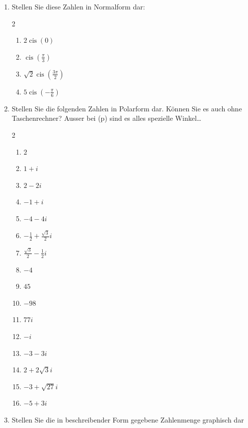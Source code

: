 \begin{ueb}
    {}{}
    \begin{enumerate}
        \item Stellen Sie diese Zahlen in Normalform dar:
        \begin{multicols}{2}
            \begin{enumerate}
                \item[(a)] $2 \operatorname{cis}(0)$
                \item[(b)] $\operatorname{cis}\left(\frac{\pi}{3}\right)$
                \item[(c)] $\sqrt{2} \operatorname{cis}\left(\frac{3\pi}{2}\right)$
                \item[(d)] $5 \operatorname{cis}\left(-\frac{\pi}{6}\right)$
            \end{enumerate}
            \end{multicols}
        
        \item Stellen Sie die folgenden Zahlen in Polarform dar. Können Sie es auch ohne Taschenrechner? Ausser bei (p) sind es alles spezielle Winkel\dots 
        \begin{multicols}{2}
        \begin{enumerate}
            \item $2$
            \item $1 + i$
            \item $2 - 2i$
            \item $-1 + i$
            \item $-4 - 4i$
            \item $-\frac{1}{2} + \frac{\sqrt{3}}{2}i$
            \item $\frac{\sqrt{3}}{2} - \frac{1}{2}i$
            \item $-4$
            \item    $45$
            \item $-98$
            \item $77i$
            \item $-i$
            \item $-3 - 3i$
            \item $2 + 2\sqrt{3} i$
            \item $-3 + \sqrt{27} i$
            \item $-5 + 3i$
        \end{enumerate}
        \end{multicols}
        \item Stellen Sie die in beschreibender Form gegebene Zahlenmenge graphisch dar
        

\end{enumerate}
\end{ueb}

